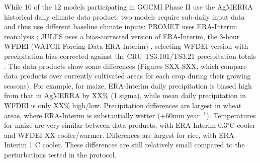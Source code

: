 \documentclass[gmd, manuscript]{copernicus} %
\begin{document}

While 10 of the 12 models participating in GGCMI Phase II use the AgMERRA historical daily climate data product, two models require sub-daily input data and thus use different baseline climate inputs:
PROMET uses ERA-Interim reanalysis \citep{dee2011era}; JULES uses a bias-corrected version of ERA-Interim, the 3-hour WFDEI (WATCH-Forcing-Data-ERA-Interim) \citep{weedon2014wfdei}, selecting WFDEI version with precipitation bias-corrected against the CRU TS3.101/TS3.21 precipitation totals \citep{harris_cru_2014}.
The data products show some differences (Figures SXX-SXX, which compare data products over currently cultivated areas for each crop during their growing seasons). 
For example, for maize, ERA-Interim daily precipitation is biased high from that in AgMERRA by XX\% (1 sigma), while mean daily precipitation in WFDEI is only XX\% high/low. 
Precipitation differences are largest in wheat areas, where ERA-Interim is substantially wetter (+60mm year$^{-1}$). 
Temperatures for maize are very similar between data products, with ERA-Interim 0.3$^\circ$C cooler and WFDEI XX cooler/warmer. 
Differences are largest for rice, with ERA-Interim 1$^\circ$C cooler. 
These differences are still relatively small compared to the perturbations tested in the protocol.

\end{document}
